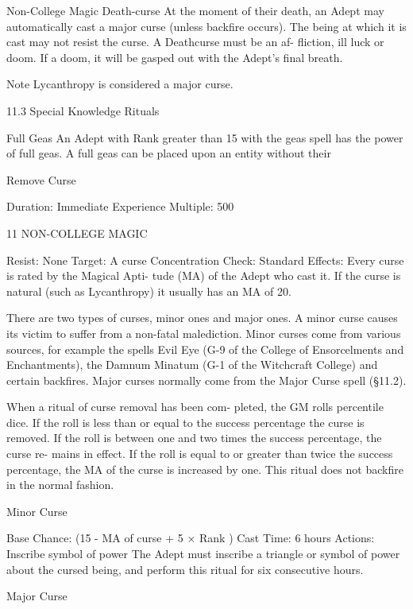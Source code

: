 \begin{Chapter}{Non-College Magic}
Death-curse  At  the  moment  of  their  death,  an 
Adept may automatically cast a major curse (unless 
backfire occurs). The being at which it is cast may 
not  resist  the  curse.  A  Deathcurse  must  be  an  af-
fliction,  ill  luck  or  doom.  If  a  doom,  it  will  be 
gasped out with the Adept’s final breath. 

Note Lycanthropy is considered a major curse. 

11.3 Special Knowledge Rituals 

Full  Geas  An  Adept  with  Rank  greater  than  15 
with  the  geas  spell  has  the  power  of  full  geas.  A 
full geas can be placed upon an entity without their 

Remove Curse 

Duration: Immediate 
Experience Multiple: 500 

11 NON-COLLEGE MAGIC 

Resist: None 
Target: A curse 
Concentration Check: Standard 
Effects:  Every  curse  is  rated  by  the  Magical  Apti-
tude (MA) of the Adept who cast it. If the curse is 
natural (such as Lycanthropy) it usually has an MA 
of 20. 

There  are  two  types  of  curses,  minor  ones  and 
major  ones.  A  minor  curse  causes  its  victim  to 
suffer  from  a  non-fatal  malediction.  Minor  curses 
come from various sources, for example the spells 
Evil Eye (G-9 of the College of Ensorcelments and 
Enchantments), the Damnum Minatum (G-1 of the 
Witchcraft  College)  and  certain  backfires.  Major 
curses  normally  come  from  the  Major  Curse  spell 
(§11.2). 

When  a  ritual  of  curse  removal  has  been  com-
pleted,  the  GM  rolls  percentile  dice.  If  the  roll  is 
less  than  or  equal  to  the  success  percentage  the 
curse  is  removed.  If  the  roll  is  between  one  and 
two  times  the  success  percentage,  the  curse  re-
mains in effect. If the roll is equal to or greater than 
twice  the  success percentage,  the  MA  of  the  curse 
is increased by one. This ritual does not backfire in 
the normal fashion. 

Minor Curse 

Base Chance: (15 - MA of curse + 5 × Rank )%
Cast Time: 6 hours 
Actions: Inscribe symbol of power 
The  Adept  must  inscribe  a  triangle  or  symbol  of 
power  about  the  cursed  being,  and  perform  this 
ritual for six consecutive hours. 

Major Curse 


\end{Chapter}

